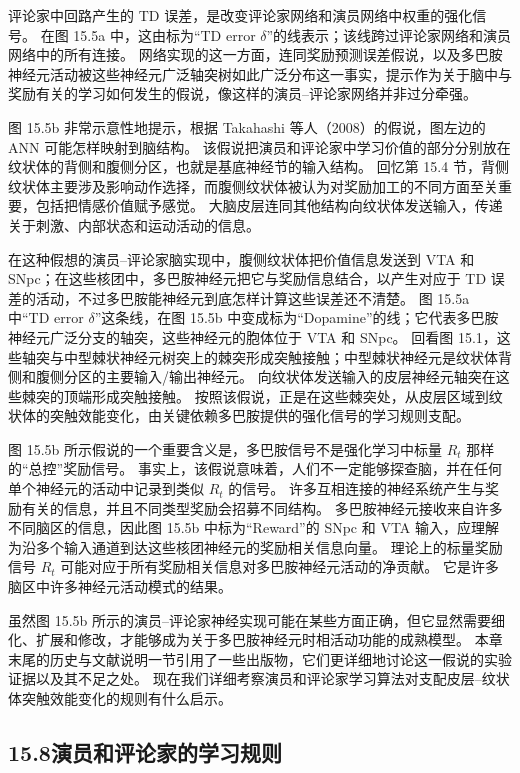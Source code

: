 \documentclass[UTF8, 12pt, fontset=fandol, oneside]{ctexart}
\begin{document}
评论家中回路产生的 TD 误差，是改变评论家网络和演员网络中权重的强化信号。
在图 15.5a 中，这由标为“TD error $\delta$”的线表示；该线跨过评论家网络和演员网络中的所有连接。
网络实现的这一方面，连同奖励预测误差假说，以及多巴胺神经元活动被这些神经元广泛轴突树如此广泛分布这一事实，提示作为关于脑中与奖励有关的学习如何发生的假说，像这样的演员--评论家网络并非过分牵强。

图 15.5b 非常示意性地提示，根据 Takahashi 等人（2008）的假说，图左边的 ANN 可能怎样映射到脑结构。
该假说把演员和评论家中学习价值的部分分别放在纹状体的背侧和腹侧分区，也就是基底神经节的输入结构。
回忆第 15.4 节，背侧纹状体主要涉及影响动作选择，而腹侧纹状体被认为对奖励加工的不同方面至关重要，包括把情感价值赋予感觉。
大脑皮层连同其他结构向纹状体发送输入，传递关于刺激、内部状态和运动活动的信息。

在这种假想的演员--评论家脑实现中，腹侧纹状体把价值信息发送到 VTA 和 SNpc；在这些核团中，多巴胺神经元把它与奖励信息结合，以产生对应于 TD 误差的活动，不过多巴胺能神经元到底怎样计算这些误差还不清楚。
图 15.5a 中“TD error $\delta$”这条线，在图 15.5b 中变成标为“Dopamine”的线；它代表多巴胺神经元广泛分支的轴突，这些神经元的胞体位于 VTA 和 SNpc。
回看图 15.1，这些轴突与中型棘状神经元树突上的棘突形成突触接触；中型棘状神经元是纹状体背侧和腹侧分区的主要输入/输出神经元。
向纹状体发送输入的皮层神经元轴突在这些棘突的顶端形成突触接触。
按照该假说，正是在这些棘突处，从皮层区域到纹状体的突触效能变化，由关键依赖多巴胺提供的强化信号的学习规则支配。

图 15.5b 所示假说的一个重要含义是，多巴胺信号不是强化学习中标量 $R_t$ 那样的“总控”奖励信号。
事实上，该假说意味着，人们不一定能够探查脑，并在任何单个神经元的活动中记录到类似 $R_t$ 的信号。
许多互相连接的神经系统产生与奖励有关的信息，并且不同类型奖励会招募不同结构。
多巴胺神经元接收来自许多不同脑区的信息，因此图 15.5b 中标为“Reward”的 SNpc 和 VTA 输入，应理解为沿多个输入通道到达这些核团神经元的奖励相关信息向量。
理论上的标量奖励信号 $R_t$ 可能对应于所有奖励相关信息对多巴胺神经元活动的净贡献。
它是许多脑区中许多神经元活动模式的结果。

虽然图 15.5b 所示的演员--评论家神经实现可能在某些方面正确，但它显然需要细化、扩展和修改，才能够成为关于多巴胺神经元时相活动功能的成熟模型。
本章末尾的历史与文献说明一节引用了一些出版物，它们更详细地讨论这一假说的实验证据以及其不足之处。
现在我们详细考察演员和评论家学习算法对支配皮层--纹状体突触效能变化的规则有什么启示。

\subsection*{15.8\quad 演员和评论家的学习规则}
\end{document}
